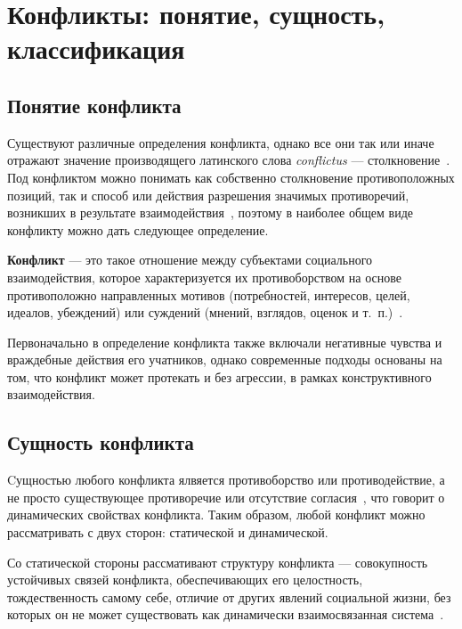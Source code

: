 \chapter{Конфликты: понятие, сущность, классификация}

\section{Понятие конфликта}

Существуют различные определения конфликта, однако все они так или иначе
отражают значение производящего латинского слова \textit{conflictus} ---
столкновение~\cite{book06}. Под конфликтом можно понимать как собственно
столкновение противоположных позиций, так и способ или действия разрешения
значимых противоречий, возникших в результате взаимодействия~\cite{book04},
поэтому в наиболее общем виде конфликту можно дать следующее определение.

\textbf{Конфликт} --- это такое отношение между субъектами социального
взаимодействия, которое характеризуется их противоборством на основе
противоположно направленных мотивов (потребностей, интересов, целей, идеалов,
убеждений) или суждений (мнений, взглядов, оценок и т.~п.)~\cite{book03}.

Первоначально в определение конфликта также включали негативные чувства и
враждебные действия его учатников, однако современные подходы основаны на том,
что конфликт может протекать и без агрессии, в рамках конструктивного
взаимодействия.

\section{Сущность конфликта}

Cущностью любого конфликта ялвяется противоборство или противодействие, а не
просто существующее противоречие или отсутствие согласия~\cite{book07}, что говорит о
динамических свойствах конфликта. Таким образом, любой конфликт можно
рассматривать с двух сторон: статической и динамической.

Со статической стороны рассмативают структуру конфликта --- совокупность
устойчивых связей конфликта, обеспечивающих его целостность, тождественность
самому себе, отличие от других явлений социальной жизни, без которых он
не может существовать как динамически взаимосвязанная
система~\cite{book04}.

